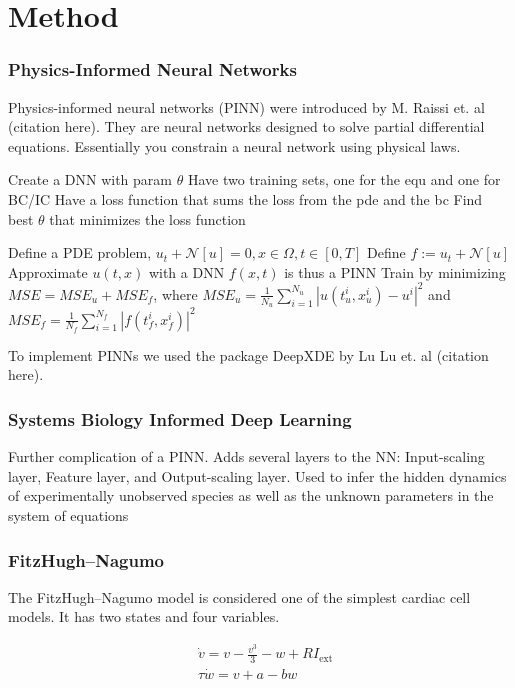 \chapter{Method}
\label{sec:method}

\subsection{Physics-Informed Neural Networks}

Physics-informed neural networks (PINN) were introduced by M. Raissi et. al (citation here). 
They are neural networks designed to solve partial differential equations. 
Essentially you constrain a neural network using physical laws.

Create a DNN with param $\theta$
Have two training sets, one for the equ and one for BC/IC
Have a loss function that sums the loss from the pde and the bc
Find best $\theta$ that minimizes the loss function

Define a PDE problem, $u_{t}+\mathcal{N}[u]=0, x \in \Omega, t \in[0, T]$
Define $f:=u_{t}+\mathcal{N}[u]$
Approximate $u(t,x)$ with a DNN
$f(x,t)$ is thus a PINN 
Train by minimizing $M S E=M S E_{u}+M S E_{f}$, where $M S E_{u}=\frac{1}{N_{u}} \sum_{i=1}^{N_{u}}\left|u\left(t_{u}^{i}, x_{u}^{i}\right)-u^{i}\right|^{2}$ and $M S E_{f}=\frac{1}{N_{f}} \sum_{i=1}^{N_{f}}\left|f\left(t_{f}^{i}, x_{f}^{i}\right)\right|^{2}$

To implement PINNs we used the package DeepXDE by Lu Lu et. al (citation here). 


\subsection{Systems Biology Informed Deep Learning}

Further complication of a PINN. 
Adds several layers to the NN: Input-scaling layer, Feature layer, and Output-scaling layer.
Used to infer the hidden dynamics of experimentally unobserved species as well as the unknown parameters in the system of equations


\subsection{FitzHugh–Nagumo}

The FitzHugh–Nagumo model is considered one of the simplest cardiac cell models. It has two states and four variables.

\begin{align}\label{eq:fhn}
    &\dot{v}=v-\frac{v^{3}}{3}-w+R I_{\mathrm{ext}} \\
    &\tau \dot{w}=v+a-b w
\end{align}








